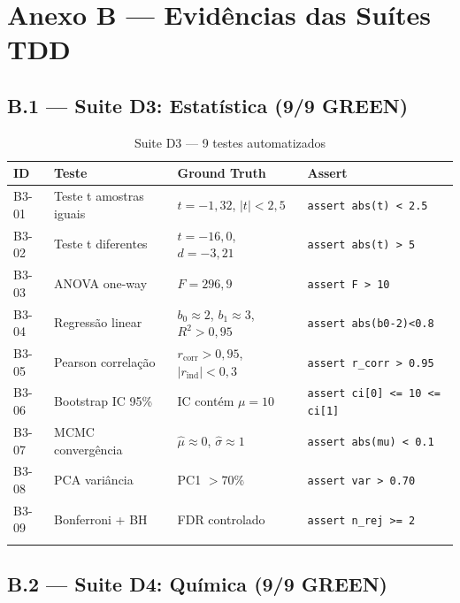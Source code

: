 \documentclass[12pt,a4paper,oneside]{article}
\begin{document}
\newpage

\section{Anexo B — Evidências das Suítes TDD}

\subsection{B.1 — Suite D3: Estatística (9/9 GREEN)}

\begin{longtable}{p{}p{}p{}p{}}
\toprule
\textbf{ID} & \textbf{Teste} & \textbf{Ground Truth} & \textbf{Assert} \\
\midrule
B3-01 & Teste t amostras iguais & $t=-1{,}32$, $|t|<2{,}5$ & \texttt{assert abs(t) < 2.5} \\
B3-02 & Teste t diferentes & $t=-16{,}0$, $d=-3{,}21$ & \texttt{assert abs(t) > 5} \\
B3-03 & ANOVA one-way & $F=296{,}9$ & \texttt{assert F > 10} \\
B3-04 & Regressão linear & $b_0\approx2$, $b_1\approx3$, $R^2>0{,}95$ & \texttt{assert abs(b0-2)<0.8} \\
B3-05 & Pearson correlação & $r_{\text{corr}}>0{,}95$, $|r_{\text{ind}}|<0{,}3$ & \texttt{assert r\_corr > 0.95} \\
B3-06 & Bootstrap IC 95\% & IC contém $\mu=10$ & \texttt{assert ci[0] <= 10 <= ci[1]} \\
B3-07 & MCMC convergência & $\hat{\mu}\approx0$, $\hat{\sigma}\approx1$ & \texttt{assert abs(mu) < 0.1} \\
B3-08 & PCA variância & PC1 $>70\%$ & \texttt{assert var > 0.70} \\
B3-09 & Bonferroni + BH & FDR controlado & \texttt{assert n\_rej >= 2} \\
\bottomrule
\caption{Suite D3 — 9 testes automatizados}
\end{longtable}

\subsection{B.2 — Suite D4: Química (9/9 GREEN)}
\end{document}
